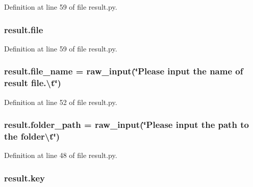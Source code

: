 Definition at line 59 of file result.\+py.

\subsubsection[{\texorpdfstring{file}{file}}]{\setlength{\rightskip}{0pt plus 5cm}result.\+file}\hypertarget{namespaceresult_ae5575afe3471c44d58e35b68ecc4a82f}{}\label{namespaceresult_ae5575afe3471c44d58e35b68ecc4a82f}


Definition at line 59 of file result.\+py.

\subsubsection[{\texorpdfstring{file\+\_\+name}{file_name}}]{\setlength{\rightskip}{0pt plus 5cm}result.\+file\+\_\+name = raw\+\_\+input(\char`\"{}Please input the name of result file.\textbackslash{}t\char`\"{})}\hypertarget{namespaceresult_acf51e2242cbe71fdb781f378dd1b08f8}{}\label{namespaceresult_acf51e2242cbe71fdb781f378dd1b08f8}


Definition at line 52 of file result.\+py.

\subsubsection[{\texorpdfstring{folder\+\_\+path}{folder_path}}]{\setlength{\rightskip}{0pt plus 5cm}result.\+folder\+\_\+path = raw\+\_\+input(\char`\"{}Please input the path to the folder\textbackslash{}t\char`\"{})}\hypertarget{namespaceresult_a28b7e2030adf7744b4ff42da31c0a58a}{}\label{namespaceresult_a28b7e2030adf7744b4ff42da31c0a58a}


Definition at line 48 of file result.\+py.

\subsubsection[{\texorpdfstring{key}{key}}]{\setlength{\rightskip}{0pt plus 5cm}result.\+key}\hypertarget{namespaceresult_a37523b375176c9d24964d26e915bce32}{}\label{namespaceresult_a37523b375176c9d24964d26e915bce32}


